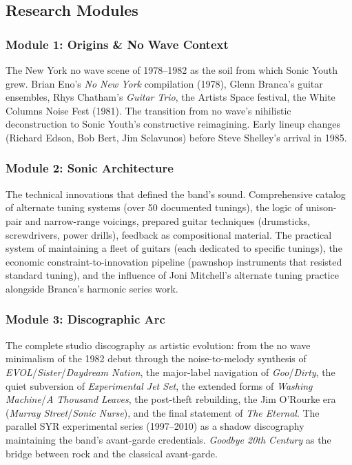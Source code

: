 \documentclass[11pt,letterpaper]{article}
\begin{document}
\subsection{Research Modules}

\subsubsection{Module 1: Origins \& No Wave Context}

The New York no wave scene of 1978--1982 as the soil from which Sonic Youth grew. Brian Eno's \textit{No New York} compilation (1978), Glenn Branca's guitar ensembles, Rhys Chatham's \textit{Guitar Trio}, the Artists Space festival, the White Columns Noise Fest (1981). The transition from no wave's nihilistic deconstruction to Sonic Youth's constructive reimagining. Early lineup changes (Richard Edson, Bob Bert, Jim Sclavunos) before Steve Shelley's arrival in 1985.

\subsubsection{Module 2: Sonic Architecture}

The technical innovations that defined the band's sound. Comprehensive catalog of alternate tuning systems (over 50 documented tunings), the logic of unison-pair and narrow-range voicings, prepared guitar techniques (drumsticks, screwdrivers, power drills), feedback as compositional material. The practical system of maintaining a fleet of guitars (each dedicated to specific tunings), the economic constraint-to-innovation pipeline (pawnshop instruments that resisted standard tuning), and the influence of Joni Mitchell's alternate tuning practice alongside Branca's harmonic series work.

\subsubsection{Module 3: Discographic Arc}

The complete studio discography as artistic evolution: from the no wave minimalism of the 1982 debut through the noise-to-melody synthesis of \textit{EVOL}/\textit{Sister}/\textit{Daydream Nation}, the major-label navigation of \textit{Goo}/\textit{Dirty}, the quiet subversion of \textit{Experimental Jet Set}, the extended forms of \textit{Washing Machine}/\textit{A Thousand Leaves}, the post-theft rebuilding, the Jim O'Rourke era (\textit{Murray Street}/\textit{Sonic Nurse}), and the final statement of \textit{The Eternal}. The parallel SYR experimental series (1997--2010) as a shadow discography maintaining the band's avant-garde credentials. \textit{Goodbye 20th Century} as the bridge between rock and the classical avant-garde.
\end{document}
